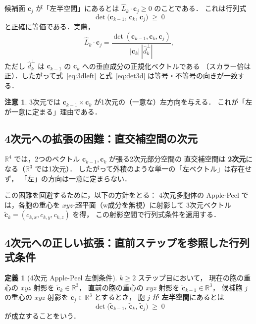 \documentclass[12pt,a4paper]{article}
\theoremstyle{definition}
\newtheorem{defn}{定義}[section]
\newtheorem{remark}{注意}[section]
\begin{document}
候補面 $\mathbf{c}_j$ が「左半空間」にあるとは $\hat{L}_k \cdot \mathbf{c}_j \ge 0$ のことである．
これは行列式
\begin{equation}
  \det\!\bigl(\mathbf{c}_{k-1},\, \mathbf{c}_k,\, \mathbf{c}_j\bigr) \;\ge\; 0
  \label{eq:det3d}
\end{equation}
と正確に等価である．実際，
\[
  \hat{L}_k \cdot \mathbf{c}_j
  = \frac{\det(\mathbf{c}_{k-1}, \mathbf{c}_k, \mathbf{c}_j)}{|\mathbf{c}_k|\,|\hat{d}_k^\perp|},
\]
ただし $\hat{d}_k^\perp$ は $\mathbf{c}_{k-1}$ の $\mathbf{c}_k$ への垂直成分の正規化ベクトルである
（スカラー倍は正）．したがって式~\eqref{eq:3dleft} と式~\eqref{eq:det3d} は等号・不等号の向きが一致する．

\begin{remark}
  3次元では $\mathbf{c}_{k-1} \times \mathbf{c}_k$ が1次元の（一意な）左方向を与える．
  これが「左が一意に定まる」理由である．
\end{remark}

\subsection{4次元への拡張の困難：直交補空間の次元}

$\mathbb{R}^4$ では，2つのベクトル $\mathbf{c}_{k-1}, \mathbf{c}_k$ が張る2次元部分空間の
直交補空間は \textbf{2次元}になる（$\mathbb{R}^3$ では1次元）．
したがって外積のような単一の「左ベクトル」は存在せず，
「左」の方向は一意に定まらない．

この困難を回避するために，以下の方針をとる：
4次元多胞体の Apple-Peel では，各胞の重心を $xyz$-超平面（w成分を無視）に射影して
3次元ベクトル $\tilde{\mathbf{c}}_k = (c_{k,x}, c_{k,y}, c_{k,z})$ を得，
この射影空間で行列式条件を適用する．

\subsection{4次元への正しい拡張：直前ステップを参照した行列式条件}

\begin{defn}[4次元 Apple-Peel 左側条件]
  \label{defn:4dleft}
  $k \ge 2$ ステップ目において，
  現在の胞の重心の $xyz$ 射影を $\tilde{\mathbf{c}}_k \in \mathbb{R}^3$，
  直前の胞の重心の $xyz$ 射影を $\tilde{\mathbf{c}}_{k-1} \in \mathbb{R}^3$，
  候補胞 $j$ の重心の $xyz$ 射影を $\tilde{\mathbf{c}}_j \in \mathbb{R}^3$ とするとき，
  胞 $j$ が \textbf{左半空間}にあるとは
  \begin{equation}
    \det\!\bigl(\tilde{\mathbf{c}}_{k-1},\, \tilde{\mathbf{c}}_k,\, \tilde{\mathbf{c}}_j\bigr) \;\ge\; 0
    \label{eq:4dleft}
  \end{equation}
  が成立することをいう．
\end{defn}
\end{document}
